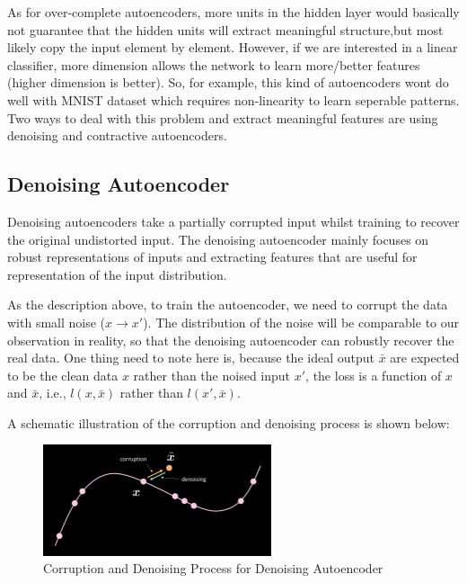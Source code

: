 As for over-complete autoencoders, more units in the hidden layer would basically not guarantee that the hidden units will extract meaningful structure,but most likely copy the input element by element. However, if we are interested in a linear classifier, more dimension allows the network to learn more/better features (higher dimension is better). So, for example, this kind of autoencoders wont do well with MNIST dataset which requires non-linearity to learn seperable patterns. Two ways to deal with this problem and extract meaningful features are using denoising and contractive autoencoders.

\subsection{Denoising Autoencoder}

Denoising autoencoders take a partially corrupted input whilst training to recover the original undistorted input. The denoising autoencoder mainly focuses on robust representations of inputs and extracting features that are useful for representation of the input distribution.

As the description above, to train the autoencoder, we need to corrupt the data with small noise ($x \rightarrow x'$). The distribution of the noise will be comparable to our observation in reality, so that the denoising autoencoder can robustly recover the real data.
One thing need to note here is, because the ideal output $\bar{x}$ are expected to be the clean data $x$ rather than the noised input $x'$, the loss is a function of $x$ and $\bar{x}$, i.e., $l(x,\bar{x})$ rather than $l(x',\bar{x})$.

A schematic illustration of the corruption and denoising process is shown below:

\begin{figure}[htb]
    \centering
    \includegraphics[width=0.6\textwidth]{figs/Corrpution_and_Denoising.png}
    \caption{Corruption and Denoising Process for Denoising Autoencoder}
    \label{fig:Corrpution_and_Denoising}
\end{figure}


